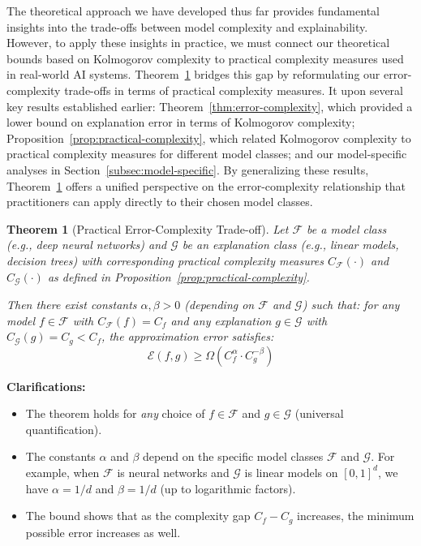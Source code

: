 \documentclass[11pt,letter,leqno]{article}
\newtheorem{theorem}{Theorem}[section]
\begin{document}
The theoretical approach we have developed thus far provides fundamental insights into the trade-offs between model complexity and explainability.  However, to apply these insights in practice, we must connect our theoretical bounds based on Kolmogorov complexity to practical complexity measures used in real-world AI systems.  Theorem~\ref{thm:practical-tradeoff} bridges this gap by reformulating our error-complexity trade-offs in terms of practical complexity measures.  It upon several key results established earlier: Theorem~\ref{thm:error-complexity}, which provided a lower bound on explanation error in terms of Kolmogorov complexity; Proposition~\ref{prop:practical-complexity}, which related Kolmogorov complexity to practical complexity measures for different model classes; and our model-specific analyses in Section~\ref{subsec:model-specific}.  By generalizing these results, Theorem~\ref{thm:practical-tradeoff} offers a unified perspective on the error-complexity relationship that practitioners can apply directly to their chosen model classes.

\begin{theorem}[Practical Error-Complexity Trade-off]
\label{thm:practical-tradeoff}
Let $\mathcal{F}$ be a model class (e.g., deep neural networks) and $\mathcal{G}$ be an 
explanation class (e.g., linear models, decision trees) with corresponding practical complexity 
measures $C_{\mathcal{F}}(\cdot)$ and $C_{\mathcal{G}}(\cdot)$ as defined in 
Proposition~\ref{prop:practical-complexity}.

Then there exist constants $\alpha, \beta > 0$ (depending on $\mathcal{F}$ and $\mathcal{G}$) 
such that: for any model $f \in \mathcal{F}$ with $C_{\mathcal{F}}(f) = C_f$ and any 
explanation $g \in \mathcal{G}$ with $C_{\mathcal{G}}(g) = C_g < C_f$, the approximation 
error satisfies:
\begin{equation}
\mathcal{E}(f, g) \geq \Omega\left(C_f^{\alpha} \cdot C_g^{-\beta}\right)
\end{equation}
\end{theorem}

\textbf{Clarifications:}
\begin{itemize}
\item The theorem holds for \emph{any} choice of $f \in \mathcal{F}$ and $g \in \mathcal{G}$ 
(universal quantification).

\item The constants $\alpha$ and $\beta$ depend on the specific model classes $\mathcal{F}$ 
and $\mathcal{G}$. For example, when $\mathcal{F}$ is neural networks and $\mathcal{G}$ is 
linear models on $[0,1]^d$, we have $\alpha = 1/d$ and $\beta = 1/d$ (up to logarithmic factors).

\item The bound shows that as the complexity gap $C_f - C_g$ increases, the minimum possible 
error increases as well.
\end{itemize}
\end{document}

